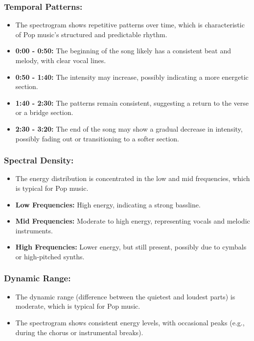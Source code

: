\documentclass[a4paper,12pt]{article}
\begin{document}
\subsubsection{Temporal Patterns:}
\begin{itemize}
    \item The spectrogram shows repetitive patterns over time, which is characteristic of Pop music's structured and predictable rhythm.
    \item \textbf{0:00 - 0:50:} The beginning of the song likely has a consistent beat and melody, with clear vocal lines.
    \item \textbf{0:50 - 1:40:} The intensity may increase, possibly indicating a more energetic section.
    \item \textbf{1:40 - 2:30:} The patterns remain consistent, suggesting a return to the verse or a bridge section.
    \item \textbf{2:30 - 3:20:} The end of the song may show a gradual decrease in intensity, possibly fading out or transitioning to a softer section.
\end{itemize}
\subsubsection{Spectral Density:}
\begin{itemize}
    \item The energy distribution is concentrated in the low and mid frequencies, which is typical for Pop music.
    \item \textbf{Low Frequencies:} High energy, indicating a strong bassline.
    \item \textbf{Mid Frequencies:} Moderate to high energy, representing vocals and melodic instruments.
    \item \textbf{High Frequencies:} Lower energy, but still present, possibly due to cymbals or high-pitched synths.
\end{itemize}
\subsubsection{Dynamic Range:}
\begin{itemize}
    \item The dynamic range (difference between the quietest and loudest parts) is moderate, which is typical for Pop music.
    \item The spectrogram shows consistent energy levels, with occasional peaks (e.g., during the chorus or instrumental breaks).
\end{itemize}
\end{document}
